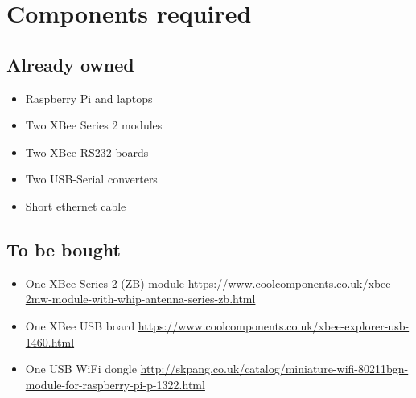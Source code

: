 \documentclass[a4paper,12pt]{article}
\begin{document}
\section{Components required}

\subsection{Already owned}

\begin{itemize}
  \item Raspberry Pi and laptops
  \item Two XBee Series 2 modules
  \item Two XBee RS232 boards
  \item Two USB-Serial converters
  \item Short ethernet cable
\end{itemize}

\subsection{To be bought}

\begin{itemize}
  \item One XBee Series 2 (ZB) module \url{https://www.coolcomponents.co.uk/xbee-2mw-module-with-whip-antenna-series-zb.html}
  \item One XBee USB board \url{https://www.coolcomponents.co.uk/xbee-explorer-usb-1460.html}
  \item One USB WiFi dongle \url{http://skpang.co.uk/catalog/miniature-wifi-80211bgn-module-for-raspberry-pi-p-1322.html}
\end{itemize}
\end{document}
